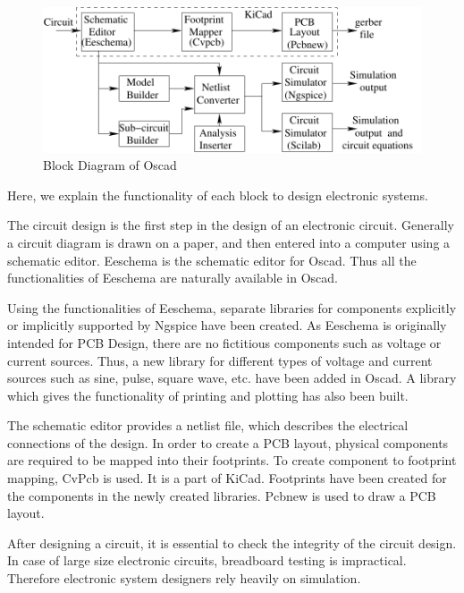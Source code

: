 \begin{figure}[h]%
\begin{center}
\includegraphics[width=1\linewidth]{figures/oscadBD-eps-converted-to.pdf}%
\caption{Block Diagram of Oscad}
\label{blockd}
\end{center}
\end{figure}
Here, we explain the functionality of each block to design electronic systems.

The circuit design is the first step in the design of an electronic circuit. Generally a circuit diagram is drawn on a paper, and then entered into a computer using a schematic editor. Eeschema is the  schematic editor for Oscad. Thus all the functionalities of Eeschema are naturally available in Oscad.

Using the functionalities of Eeschema, separate libraries for components explicitly or implicitly supported by Ngspice have been created. As Eeschema is originally intended for PCB Design, there are no fictitious components such as voltage or current sources. Thus, a new library for different types of voltage and current sources such as sine, pulse, square wave, etc. have been added in Oscad. A library which gives the functionality of printing and plotting has also been built.

The schematic editor provides a netlist file, which describes the electrical connections of the  design. In order to create a PCB layout, physical components are required to be mapped into their footprints. To create component to footprint mapping, CvPcb  is used. It is a part of KiCad. Footprints have been created for the components in the newly created libraries. Pcbnew is used to draw a PCB layout.


After designing a circuit, it is essential to check the integrity of the circuit design. In case of large size electronic circuits, breadboard testing is impractical. Therefore electronic system designers rely heavily on simulation.



